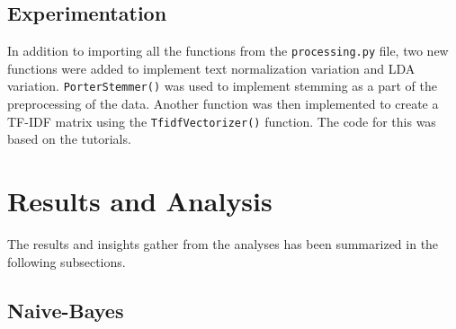 \documentclass[titlepage]{article}
\begin{document}
\subsection{Experimentation}
In addition to importing all the functions from the \texttt{processing.py} file, two new functions were added to implement text normalization 
variation and LDA variation. \texttt{PorterStemmer()} was used to implement stemming as a part of the preprocessing of the data. Another function 
was then implemented to create a TF-IDF matrix using the \texttt{TfidfVectorizer()} function. The code for this was based on the tutorials.

\section{Results and Analysis}
The results and insights gather from the analyses has been summarized in the following subsections.

\subsection{Naive-Bayes}
\end{document}
